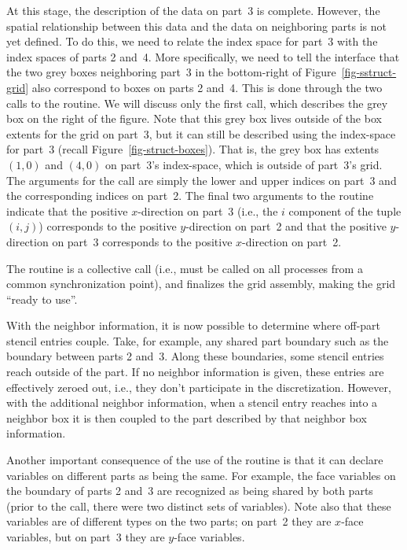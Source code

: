 At this stage, the description of the data on part~3 is complete.  However, the
spatial relationship between this data and the data on neighboring parts is not
yet defined.  To do this, we need to relate the index space for part~3 with the
index spaces of parts 2 and~4.  More specifically, we need to tell the interface
that the two grey boxes neighboring part~3 in the bottom-right of
Figure~\ref{fig-sstruct-grid} also correspond to boxes on parts 2 and~4.  This
is done through the two calls to the  routine.  We will
discuss only the first call, which describes the grey box on the right of the
figure.  Note that this grey box lives outside of the box extents for the grid
on part~3, but it can still be described using the index-space for part~3
(recall Figure~\ref{fig-struct-boxes}).  That is, the grey box has extents
$(1,0)$ and $(4,0)$ on part~3's index-space, which is outside of part~3's grid.
The arguments for the  call are simply the lower and
upper indices on part~3 and the corresponding indices on part~2.  The final two
arguments to the routine indicate that the positive $x$-direction on part~3
(i.e., the $i$ component of the tuple $(i,j)$) corresponds to the positive
$y$-direction on part~2 and that the positive $y$-direction on part~3
corresponds to the positive $x$-direction on part~2.

The  routine is a collective call (i.e., must be called on all
processes from a common synchronization point), and finalizes the grid
assembly, making the grid ``ready to use''.

With the neighbor information, it is now possible to determine where off-part
stencil entries couple.  Take, for example, any shared part boundary such as
the boundary between parts 2 and~3.  Along these boundaries, some stencil
entries reach outside of the part.  If no neighbor information is given, these
entries are effectively zeroed out, i.e., they don't participate in the
discretization.  However, with the additional neighbor information, when a
stencil entry reaches into a neighbor box it is then coupled to the part
described by that neighbor box information.

Another important consequence of the use of the  routine
is that it can declare variables on different parts as being the same.  For
example, the face variables on the boundary of parts 2 and~3 are recognized as
being shared by both parts (prior to the  call, there
were two distinct sets of variables).  Note also that these variables are of
different types on the two parts; on part~2 they are $x$-face variables, but on
part~3 they are $y$-face variables.

